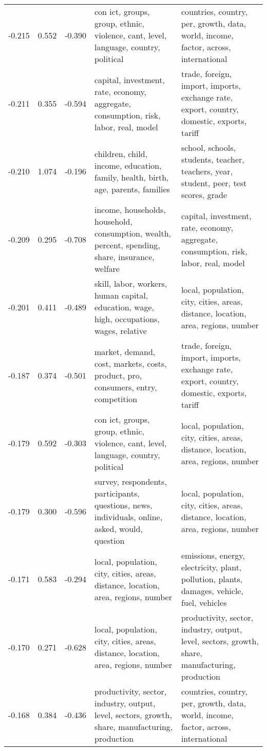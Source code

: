 \begin{tabular}{cccp{5cm}p{5cm}}
-0.215 & 0.552 & -0.390 & con ict, groups, group, ethnic, violence, cant, level, language, country, political & countries, country, per, growth, data, world, income, factor, across, international \\
-0.211 & 0.355 & -0.594 & capital, investment, rate, economy, aggregate, consumption, risk, labor, real, model & trade, foreign, import, imports, exchange rate, export, country, domestic, exports, tariff \\
-0.210 & 1.074 & -0.196 & children, child, income, education, family, health, birth, age, parents, families & school, schools, students, teacher, teachers, year, student, peer, test scores, grade \\
-0.209 & 0.295 & -0.708 & income, households, household, consumption, wealth, percent, spending, share, insurance, welfare & capital, investment, rate, economy, aggregate, consumption, risk, labor, real, model \\
-0.201 & 0.411 & -0.489 & skill, labor, workers, human capital, education, wage, high, occupations, wages, relative & local, population, city, cities, areas, distance, location, area, regions, number \\
-0.187 & 0.374 & -0.501 & market, demand, cost, markets, costs, product, pro, consumers, entry, competition & trade, foreign, import, imports, exchange rate, export, country, domestic, exports, tariff \\
-0.179 & 0.592 & -0.303 & con ict, groups, group, ethnic, violence, cant, level, language, country, political & local, population, city, cities, areas, distance, location, area, regions, number \\
-0.179 & 0.300 & -0.596 & survey, respondents, participants, questions, news, individuals, online, asked, would, question & local, population, city, cities, areas, distance, location, area, regions, number \\
-0.171 & 0.583 & -0.294 & local, population, city, cities, areas, distance, location, area, regions, number & emissions, energy, electricity, plant, pollution, plants, damages, vehicle, fuel, vehicles \\
-0.170 & 0.271 & -0.628 & local, population, city, cities, areas, distance, location, area, regions, number & productivity, sector, industry, output, level, sectors, growth, share, manufacturing, production \\
-0.168 & 0.384 & -0.436 & productivity, sector, industry, output, level, sectors, growth, share, manufacturing, production & countries, country, per, growth, data, world, income, factor, across, international \\

\end{tabular}
